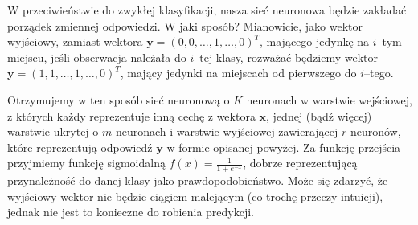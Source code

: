 \documentclass{mini}
\begin{document}
W przeciwieństwie do zwykłej klasyfikacji, nasza sieć neuronowa będzie zakładać porządek zmiennej odpowiedzi. W jaki sposób? Mianowicie, jako wektor wyjściowy, zamiast wektora $\textbf{y} = (0, 0, \ldots, 1, \ldots, 0)^T$, mającego jedynkę na $i$--tym miejscu, jeśli obserwacja należała do $i$--tej klasy, rozważać będziemy wektor $\textbf{y} = (1, 1, \ldots, 1, \ldots, 0)^T$, mający jedynki na miejscach od pierwszego do $i$--tego.

Otrzymujemy w ten sposób sieć neuronową o $K$ neuronach w warstwie wejściowej, z których każdy reprezentuje inną cechę z wektora $\textbf{x}$, jednej (bądź więcej) warstwie ukrytej o $m$ neuronach i warstwie wyjściowej zawierającej $r$ neuronów, które reprezentują odpowiedź $\textbf{y}$ w formie opisanej powyżej. Za funkcję przejścia przyjmiemy funkcję sigmoidalną $f(x) = \frac{1}{1+e^{-x}}$, dobrze reprezentującą przynależność do danej klasy jako prawdopodobieństwo. Może się zdarzyć, że wyjściowy wektor nie będzie ciągiem malejącym (co trochę przeczy intuicji), jednak nie jest to konieczne do robienia predykcji. 
\end{document}
